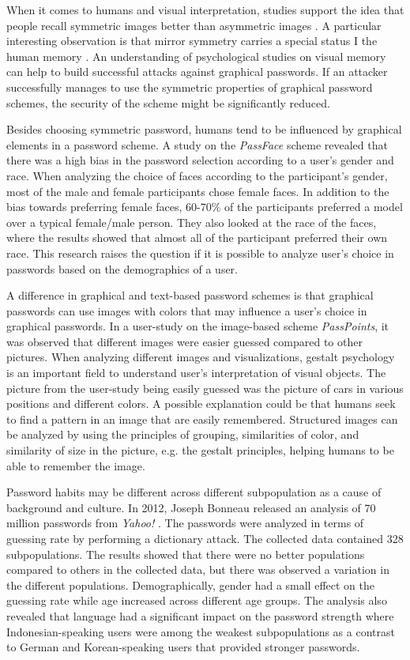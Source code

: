 	When it comes to humans and visual interpretation, studies support the idea that people recall symmetric images better than asymmetric images \cite{Attneave, French}. A particular interesting observation is that mirror symmetry carries a special status I the human memory \cite{Wagemans1}. An understanding of psychological studies on visual memory can help to build successful attacks against graphical passwords. If an attacker successfully manages to use the symmetric properties of graphical password schemes, the security of the scheme might be significantly reduced.

  Besides choosing symmetric password, humans tend to be influenced by graphical elements in a password scheme. A study on the {\it PassFace} scheme \cite{Davis} revealed that there was a high bias in the password selection according to a user's gender and race. When analyzing the choice of faces according to the participant's gender, most of the male and female participants chose female faces. In addition to the bias towards preferring female faces, 60-70\% of the participants preferred a model over a typical female/male person. They also looked at the race of the faces, where the results showed that almost all of the participant preferred their own race. This research raises the question if it is possible to analyze user's choice in passwords based on the demographics of a user.

  A difference in graphical and text-based password schemes is that graphical passwords can use images with colors that may influence a user's choice in graphical passwords. In a user-study \cite{Thorpe2} on the image-based scheme {\it PassPoints}, it was observed that different images were easier guessed compared to other pictures. When analyzing different images and visualizations, gestalt psychology \cite{Wagemans2} is an important field to understand user's interpretation of visual objects. The picture from the user-study being easily guessed was the picture of cars in various positions and different colors. A possible explanation could be that humans seek to find a pattern in an image that are easily remembered. Structured images can be analyzed by using the principles of grouping, similarities of color, and similarity of size in the picture, e.g. the gestalt principles, helping humans to be able to remember the image.

  Password habits may be different across different subpopulation as a cause of background and culture. In 2012, Joseph Bonneau released an analysis of 70 million passwords from {\it Yahoo!} \cite{Bonneau2}. The passwords were analyzed in terms of guessing rate by performing a dictionary attack. The collected data contained 328 subpopulations. The results showed that there were no better populations compared to others in the collected data, but there was observed a variation in the different populations. Demographically, gender had a small effect on the guessing rate while age increased across different age groups. The analysis also revealed that language had a significant impact on the password strength where Indonesian-speaking users were among the weakest subpopulations as a contrast to German and Korean-speaking users that provided stronger passwords.

	